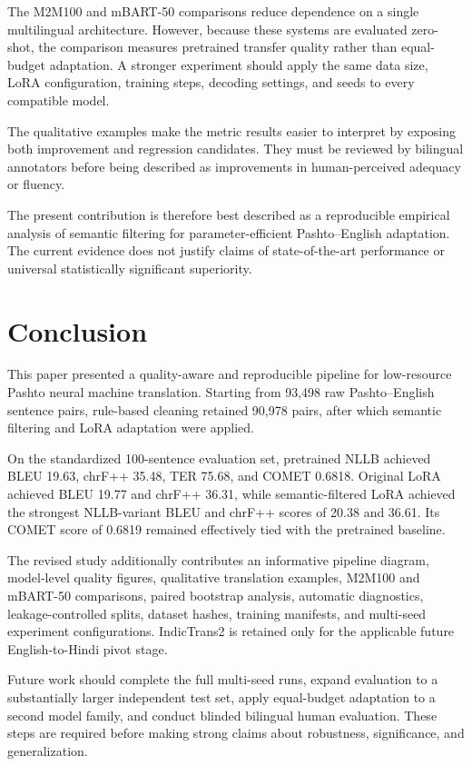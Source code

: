 \documentclass[conference]{IEEEtran}
\begin{document}
The M2M100 and mBART-50 comparisons reduce dependence on
a single multilingual architecture. However, because these
systems are evaluated zero-shot, the comparison measures
pretrained transfer quality rather than equal-budget
adaptation. A stronger experiment should apply the same
data size, LoRA configuration, training steps, decoding
settings, and seeds to every compatible model.

The qualitative examples make the metric results easier to
interpret by exposing both improvement and regression
candidates. They must be reviewed by bilingual annotators
before being described as improvements in human-perceived
adequacy or fluency.

The present contribution is therefore best described as a
reproducible empirical analysis of semantic filtering for
parameter-efficient Pashto--English adaptation. The current
evidence does not justify claims of state-of-the-art
performance or universal statistically significant
superiority.

\section{Conclusion}

This paper presented a quality-aware and reproducible
pipeline for low-resource Pashto neural machine translation.
Starting from 93,498 raw Pashto--English sentence pairs,
rule-based cleaning retained 90,978 pairs, after which
semantic filtering and LoRA adaptation were applied.

On the standardized 100-sentence evaluation
set, pretrained NLLB achieved BLEU 19.63,
chrF++ 35.48, TER 75.68,
and COMET 0.6818. Original LoRA achieved
BLEU 19.77 and chrF++
36.31, while semantic-filtered LoRA
achieved the strongest NLLB-variant BLEU and chrF++ scores
of 20.38 and
36.61. Its COMET score of
0.6819 remained effectively tied with
the pretrained baseline.

The revised study additionally contributes an informative
pipeline diagram, model-level quality figures, qualitative
translation examples, M2M100 and mBART-50 comparisons,
paired bootstrap analysis, automatic diagnostics,
leakage-controlled splits, dataset hashes, training
manifests, and multi-seed experiment configurations.
IndicTrans2 is retained only for the applicable future
English-to-Hindi pivot stage.

Future work should complete the full multi-seed runs,
expand evaluation to a substantially larger independent
test set, apply equal-budget adaptation to a second model
family, and conduct blinded bilingual human evaluation.
These steps are required before making strong claims about
robustness, significance, and generalization.
\end{document}
